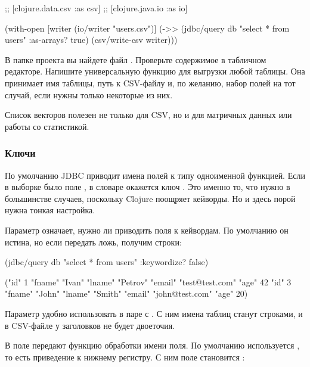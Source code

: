 \begin{english}
  \begin{clojure}
;; [clojure.data.csv :as csv]
;; [clojure.java.io :as io]

(with-open [writer (io/writer "users.csv")]
  (->> (jdbc/query db "select * from users" {:as-arrays? true})
       (csv/write-csv writer)))
  \end{clojure}
\end{english}

В папке проекта вы найдете файл . Проверьте содержимое в табличном редакторе. Напишите универсальную функцию для выгрузки любой таблицы. Она принимает имя таблицы, путь к CSV-файлу и, по желанию, набор полей на тот случай, если нужны только некоторые из них.

Список векторов полезен не только для CSV, но и для матричных данных или работы со статистикой.

\subsubsection{Ключи}

По умолчанию JDBC приводит имена полей к типу  одноименной функцией. Если в выборке было поле , в словаре окажется ключ . Это именно то, что нужно в большинстве случаев, поскольку Clojure поощряет кейворды. Но и здесь порой нужна тонкая настройка.

Параметр  означает, нужно ли приводить поля к кейвордам. По умолчанию он истина, но если передать ложь, получим строки:

\begin{english}
  \begin{clojure}
(jdbc/query db "select * from users" {:keywordize? false})

({"id" 1
  "fname" "Ivan"
  "lname" "Petrov"
  "email" "test@test.com"
  "age" 42}
 {"id" 3
  "fname" "John"
  "lname" "Smith"
  "email" "john@test.com"
  "age" 20})
  \end{clojure}
\end{english}

Параметр удобно использовать в паре с . С ним имена таблиц станут строками, и в CSV-файле у заголовков не будет двоеточия.

В поле  передают функцию обработки имени поля. По умолчанию используется , то есть приведение к нижнему регистру. С ним поле  становится :

